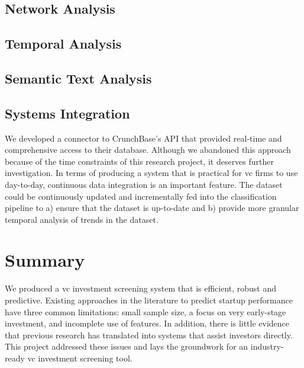 \documentclass[../thesis/thesis.tex]{subfiles}
\begin{document}
\subsection{Network Analysis} %
\subsection{Temporal Analysis} %
\subsection{Semantic Text Analysis} %
\subsection{Systems Integration} %

We developed a connector to CrunchBase’s API that provided real-time and comprehensive access to their database. Although we abandoned this approach because of the time constraints of this research project, it deserves further investigation. In terms of producing a system that is practical for \gls{vc} firms to use day-to-day, continuous data integration is an important feature. The dataset could be continuously updated and incrementally fed into the classification pipeline to a) ensure that the dataset is up-to-date and b) provide more granular temporal analysis of trends in the dataset.

\section{Summary}

We produced a \gls{vc} investment screening system that is efficient, robust and predictive. Existing approaches in the literature to predict startup performance have three common limitations: small sample size, a focus on very early-stage investment, and incomplete use of features. In addition, there is little evidence that previous research has translated into systems that assist investors directly. This project addressed these issues and lays the groundwork for an industry-ready \gls{vc} investment screening tool.

\end{document}
